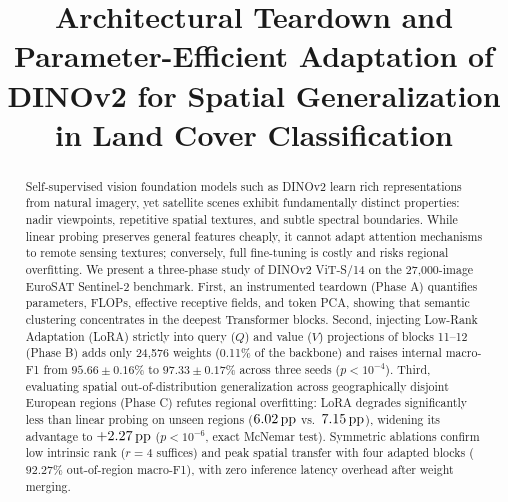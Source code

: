 \documentclass[conference]{IEEEtran}
\begin{document}
\title{Architectural Teardown and Parameter-Efficient Adaptation of DINOv2 for Spatial Generalization in Land Cover Classification}

\author{
\and
{}
\and
{}
}

\maketitle

\begin{abstract}
Self-supervised vision foundation models such as DINOv2 learn rich representations from natural imagery, yet satellite scenes exhibit fundamentally distinct properties: nadir viewpoints, repetitive spatial textures, and subtle spectral boundaries. While linear probing preserves general features cheaply, it cannot adapt attention mechanisms to remote sensing textures; conversely, full fine-tuning is costly and risks regional overfitting. We present a three-phase study of DINOv2 ViT-S/14 on the 27,000-image EuroSAT Sentinel-2 benchmark. First, an instrumented teardown (Phase A) quantifies parameters, FLOPs, effective receptive fields, and token PCA, showing that semantic clustering concentrates in the deepest Transformer blocks. Second, injecting Low-Rank Adaptation (LoRA) strictly into query ($Q$) and value ($V$) projections of blocks 11--12 (Phase B) adds only 24,576 weights (0.11\% of the backbone) and raises internal macro-F1 from $95.66 \pm 0.16\%$ to $97.33 \pm 0.17\%$ across three seeds ($p < 10^{-4}$). Third, evaluating spatial out-of-distribution generalization across geographically disjoint European regions (Phase C) refutes regional overfitting: LoRA degrades significantly less than linear probing on unseen regions ($6.02\text{\,pp}$ vs.\ $7.15\text{\,pp}$), widening its advantage to $+2.27\text{\,pp}$ ($p < 10^{-6}$, exact McNemar test). Symmetric ablations confirm low intrinsic rank ($r=4$ suffices) and peak spatial transfer with four adapted blocks ($92.27\%$ out-of-region macro-F1), with zero inference latency overhead after weight merging.
\end{abstract}
\end{document}
